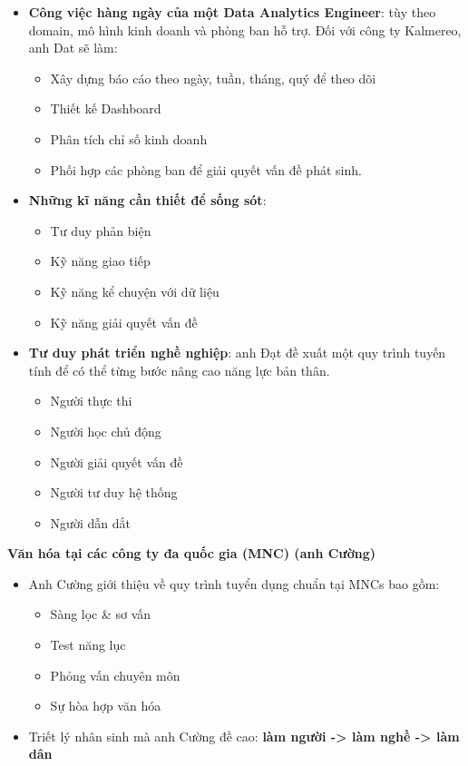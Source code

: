\begin{itemize}
\tightlist
\item
  \textbf{Công việc hàng ngày của một Data Analytics Engineer}: tùy theo
  domain, mô hình kinh doanh và phòng ban hỗ trợ. Đối với công ty
  Kalmereo, anh Dat sẽ làm:

  \begin{itemize}
  \tightlist
  \item
    Xây dựng báo cáo theo ngày, tuần, tháng, quý để theo dõi
  \item
    Thiết kế Dashboard
  \item
    Phân tích chỉ số kinh doanh
  \item
    Phối hợp các phòng ban để giải quyết vấn đề phát sinh.
  \end{itemize}
\item
  \textbf{Những kĩ năng cần thiết để sống sót}:

  \begin{itemize}
  \tightlist
  \item
    Tư duy phản biện
  \item
    Kỹ năng giao tiếp
  \item
    Kỹ năng kể chuyện với dữ liệu
  \item
    Kỹ năng giải quyết vấn đề
  \end{itemize}
\item
  \textbf{Tư duy phát triển nghề nghiệp}: anh Đạt đề xuất một quy trình
  tuyến tính để có thể từng bước nâng cao năng lực bản thân.

  \begin{itemize}
  \tightlist
  \item
    Người thực thi
  \item
    Người học chủ động
  \item
    Người giải quyết vấn đề
  \item
    Người tư duy hệ thống
  \item
    Người dẫn dắt
  \end{itemize}
\end{itemize}

\vspace{0.5em}\noindent\textbf{Văn hóa tại các công ty đa quốc gia (MNC) (anh
Cường)}\par

\begin{itemize}
\tightlist
\item
  Anh Cường giới thiệu về quy trình tuyển dụng chuẩn tại MNCs bao gồm:

  \begin{itemize}
  \tightlist
  \item
    Sàng lọc \& sơ vấn
  \item
    Test năng lục
  \item
    Phỏng vấn chuyên môn
  \item
    Sự hòa hợp văn hóa
  \end{itemize}
\item
  Triết lý nhân sinh mà anh Cường đề cao: \textbf{làm người
  -\textgreater{} làm nghề -\textgreater{} làm dân}
\end{itemize}

